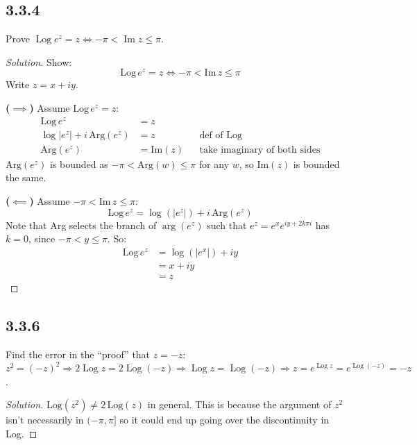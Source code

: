\documentclass{article}
\newenvironment{solution}{
\begin{proof}[Solution]}{
\end{proof}}
\begin{document}
\subsection*{3.3.4}
Prove $\operatorname{Log} e^z = z \iff -\pi < \operatorname{Im} z \le \pi$.
\begin{solution}
  Show:
  \[
    \text{Log}\, e^{z}=z \iff -\pi<\text{Im}\, z\leq\pi
  \]
  Write $z=x+iy$.

  \textbf{($\implies$)}
  Assume $\text{Log}\, e^{z}=z$:
  \begin{align*}
    \text{Log}\, e^{z} & = z \\
    \log|e^{z}|+i\,\text{Arg}(e^{z}) & = z && \text{def of Log} \\
    \text{Arg}(e^{z}) & = \text{Im}(z) && \text{take imaginary of both sides}
  \end{align*}
  $\text{Arg}(e^{z})$ is bounded as $-\pi<\text{Arg}(w)\leq\pi$ for any $w$, so $\text{Im}(z)$ is bounded the same.

  \textbf{($\impliedby$)}
  Assume $-\pi<\text{Im}\, z\leq\pi$:
  \[
    \text{Log}\, e^{z}=\log(|e^{z}|)+i\,\text{Arg}(e^{z})
  \]
  Note that Arg selects the branch of $\arg(e^{z})$ such that $e^{z}=e^{x}e^{iy+2k\pi i}$ has $k=0$, since $-\pi<y\leq\pi$. So:
  \begin{align*}
    \text{Log}\, e^{z} & = \log(|e^{x}|)+iy \\
    & = x+iy \\
    & = z
  \end{align*}
\end{solution}

\subsection*{3.3.6}
Find the error in the ``proof'' that $z = -z$:
$z^2 = (-z)^2 \Rightarrow 2 \operatorname{Log} z = 2 \operatorname{Log}(-z)
\Rightarrow \operatorname{Log} z = \operatorname{Log}(-z)
\Rightarrow z = e^{\operatorname{Log} z} = e^{\operatorname{Log}(-z)} = -z$.
\begin{solution}
  $\text{Log}(z^2) \neq 2\,\text{Log}(z)$ in general. This is because the argument of $z^2$ isn't necessarily in $(-\pi, \pi]$ so it could end up going over the discontinuity in Log.
\end{solution}
\end{document}
